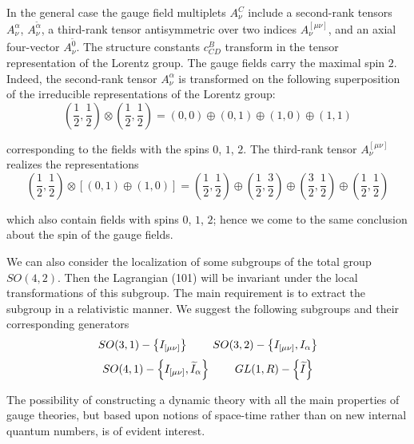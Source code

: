 \documentclass[a4paper,12pt]{article}
\begin{document}
In the general case the gauge field multiplets $A_\nu ^C$ include
a second-rank tensors $A_\nu ^\alpha $, $A_\nu ^{\widetilde{\alpha
}}$, a third-rank tensor antisymmetric over two indices $A_\nu
^{[\mu \nu ]}$, and an axial four-vector $A_\nu ^{\widetilde{0}}$.
The structure constants $ c_{CD}^B$ transform in the tensor
representation of the Lorentz group. The gauge fields carry the
maximal spin $2$. Indeed, the second-rank tensor $ A_\nu ^\alpha $
is transformed on the following superposition of the irreducible
representations of the Lorentz group:
\begin{equation}
\left( \frac 12,\frac 12\right) \otimes \left( \frac 12,\frac 12\right)
=\left( 0,0\right) \oplus \left( 0,1\right) \oplus \left( 1,0\right) \oplus
\left( 1,1\right)  \label{107}
\end{equation}

corresponding to the fields with the spins $0$, $1$, $2$. The third-rank
tensor $A_\nu ^{[\mu \nu ]}$ realizes the representations
\begin{equation}
\left( \frac 12,\frac 12\right) \otimes \left[ \left( 0,1\right) \oplus
\left( 1,0\right) \right] =\left( \frac 12,\frac 12\right) \oplus \left(
\frac 12,\frac 32\right) \oplus \left( \frac 32,\frac 12\right) \oplus
\left( \frac 12,\frac 12\right)  \label{108}
\end{equation}

which also contain fields with spins $0$, $1$, $2$; hence we come to the
same conclusion about the spin of the gauge fields.

We can also consider the localization of some subgroups of the
total group $ SO(4,2).$ Then the Lagrangian (101) will be
invariant under the local transformations of this subgroup. The
main requirement is to extract the subgroup in a relativistic
manner. We suggest the following subgroups and their corresponding
generators
\[
SO(3,1)-\left\{ I_{[\mu \nu ]}\right\} \hspace{0.3in}SO(3,2)-\left\{ I_{[\mu
\nu ]},I_\alpha \right\}
\]
\begin{equation}
SO(4,1)-\left\{ I_{[\mu \nu ]},\widetilde{I}_\alpha \right\}
\hspace{0.3in} GL(1,R)-\left\{ \widetilde{I}\right\}  \label{109}
\end{equation}

The possibility of constructing a dynamic theory with all the main
properties of gauge theories, but based upon notions of space-time rather
than on new internal quantum numbers, is of evident interest.
\end{document}
